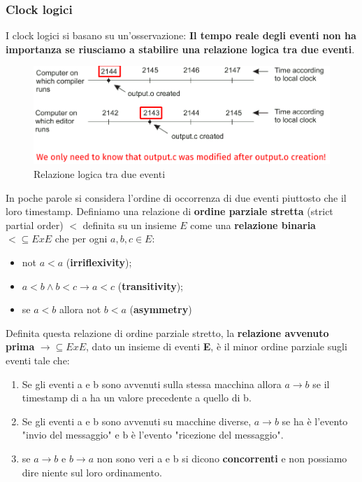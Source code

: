 \documentclass[12pt]{article}
\begin{document}
		\subsubsection{Clock logici}
			I clock logici si basano su un'osservazione: \textbf{Il tempo reale degli eventi non ha importanza se riusciamo a stabilire una relazione logica tra due eventi}.
			\begin{figure}[h!]
				\centering
				\includegraphics[scale=0.45]{img/timestamp3.png}
				\caption{Relazione logica tra due eventi}
			\end{figure}
			In poche parole si considera l'ordine di occorrenza di due eventi piuttosto che il loro timestamp. Definiamo una relazione di \textbf{ordine parziale stretta} (strict partial order) $<$ definita su un insieme $E$ come una \textbf{relazione binaria} $<\subseteq ExE$ che per ogni $a,b,c \in E $:
			\begin{itemize}
				\item not $a<a$ (\textbf{irriflexivity});
				\item $a<b \wedge b<c \rightarrow a<c $ (\textbf{transitivity});
				\item se $a<b$ allora not $b<a$ (\textbf{asymmetry})
			\end{itemize}
			Definita questa relazione di ordine parziale stretto, la \textbf{relazione avvenuto prima} $\rightarrow \subseteq ExE$, dato un insieme di eventi \textbf{E}, è il minor ordine parziale sugli eventi tale che: 
			\begin{enumerate}
				\item Se gli eventi a e b sono avvenuti sulla stessa macchina allora $a \rightarrow b$ se il timestamp di a ha un valore precedente a quello di b.
				\item Se gli eventi a e b sono avvenuti su macchine diverse, $a \rightarrow b$ se ha è l'evento "invio del messaggio" e b è l'evento "ricezione del messaggio".
				\item se $a \rightarrow b$ e $b \rightarrow a$ non sono veri a e b si dicono \textbf{concorrenti} e non possiamo dire niente sul loro ordinamento.
			\end{enumerate} 
\end{document}
